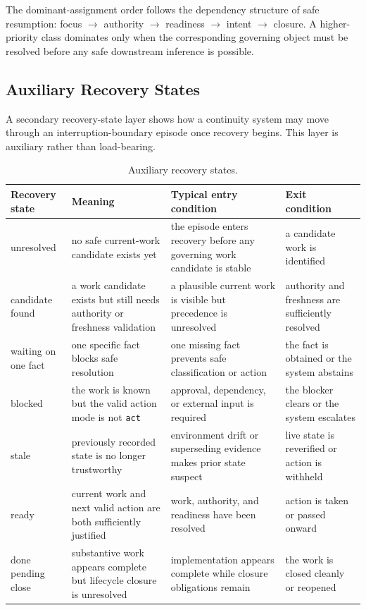 \documentclass[a4paper,fleqn]{cas-sc}
\begin{document}
The dominant-assignment order follows the dependency structure of safe resumption: focus $\rightarrow$ authority $\rightarrow$ readiness $\rightarrow$ intent $\rightarrow$ closure. A higher-priority class dominates only when the corresponding governing object must be resolved before any safe downstream inference is possible.

\subsection{Auxiliary Recovery States}

A secondary recovery-state layer shows how a continuity system may move through an interruption-boundary episode once recovery begins. This layer is auxiliary rather than load-bearing.

\begin{table}[H]
\caption{Auxiliary recovery states.}
\label{tab:recovery-states}
\centering
\footnotesize
\setlength{\tabcolsep}{4pt}
\begin{tabularx}{\textwidth}{>{\raggedright\arraybackslash}p{} >{\raggedright\arraybackslash}p{} >{\raggedright\arraybackslash}p{} X}
\toprule
Recovery state & Meaning & Typical entry condition & Exit condition \\
\midrule
unresolved & no safe current-work candidate exists yet & the episode enters recovery before any governing work candidate is stable & a candidate work is identified \\
candidate found & a work candidate exists but still needs authority or freshness validation & a plausible current work is visible but precedence is unresolved & authority and freshness are sufficiently resolved \\
waiting on one fact & one specific fact blocks safe resolution & one missing fact prevents safe classification or action & the fact is obtained or the system abstains \\
blocked & the work is known but the valid action mode is not \texttt{act} & approval, dependency, or external input is required & the blocker clears or the system escalates \\
stale & previously recorded state is no longer trustworthy & environment drift or superseding evidence makes prior state suspect & live state is reverified or action is withheld \\
ready & current work and next valid action are both sufficiently justified & work, authority, and readiness have been resolved & action is taken or passed onward \\
done pending close & substantive work appears complete but lifecycle closure is unresolved & implementation appears complete while closure obligations remain & the work is closed cleanly or reopened \\
\bottomrule
\end{tabularx}
\end{table}
\end{document}
